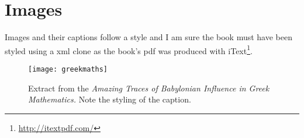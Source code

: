 \section{Images}
\indent Images and their captions follow a \latexe style and I am sure the book must have been styled using a \latexe xml clone as the book's pdf was produced with iText\footnote{\url{http://itextpdf.com/}}.

\begin{figure}[ht]
\centering
\texttt{[image: greekmaths]}
\caption{Extract from the \textit{Amazing Traces of Babylonian Influence in Greek Mathematics.} Note the styling of the caption.}
\end{figure}

\testsections

